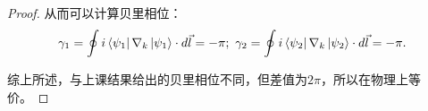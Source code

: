 \documentclass[reqno,a4paper,12pt]{amsart}
\begin{document}
\begin{proof}
从而可以计算贝里相位：
\[
	\gamma_1 = \oint i\bra{\psi_1} \nabla_k \ket{\psi_1} \cdot d\vec{l} = -\pi; \ \gamma_2 = \oint i\bra{\psi_2} \nabla_k \ket{\psi_2} \cdot d\vec{l} = -\pi.
\]

综上所述，与上课结果给出的贝里相位不同，但差值为$2\pi$，所以在物理上等价。
\end{proof}
\end{document}
